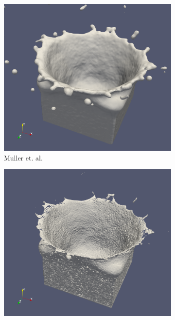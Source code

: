 \begin{figure}
	\begin{center}
		\begin{subfigure}[b]{0.48\textwidth}
			\includegraphics[width=\textwidth]{figures/MullerEtAlForRelWorkCrown.png}
			\caption{Muller et. al.}
		\end{subfigure}
		\begin{subfigure}[b]{0.48\textwidth}
			\includegraphics[width=\textwidth]{figures/OnderikEtAlForRelWorkCrown.png}

\end{subfigure}
\end{center}
\end{figure}
